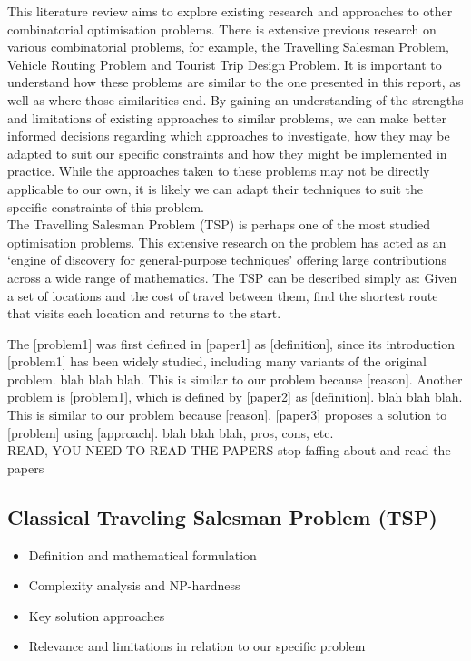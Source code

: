 This literature review aims to explore existing research and approaches to other combinatorial optimisation problems.
There is extensive previous research on various combinatorial problems, for example, the Travelling Salesman
Problem, Vehicle Routing Problem and Tourist Trip Design Problem.
It is important to understand how these problems are similar to the one presented in this report, as well as where
those similarities end.
By gaining an understanding of the strengths and limitations of existing approaches to similar problems, we can make
better informed decisions regarding which approaches to investigate, how they may be adapted to suit our specific
constraints and how they might be implemented in practice.
While the approaches taken to these problems may not be directly applicable to our own, it is likely we can adapt their
techniques to suit the specific constraints of this problem.\\

The Travelling Salesman Problem (TSP) is perhaps one of the most studied optimisation problems.
This extensive research on the problem has acted as an `engine of discovery for general-purpose techniques' offering
large contributions across a wide range of mathematics. 
The TSP can be described simply as: Given a set of locations and the cost of travel between them, find the shortest
route that visits each location and returns to the start.


The [problem1] was first defined in [paper1] as [definition], since its introduction [problem1] has been widely
studied, including many variants of the original problem.
blah blah blah.
This is similar to our problem because [reason].
Another problem is [problem1], which is defined by [paper2] as [definition].
blah blah blah.
This is similar to our problem because [reason].
[paper3] proposes a solution to [problem] using [approach].
blah blah blah, pros, cons, etc.\\

READ, YOU NEED TO READ THE PAPERS stop faffing about and read the papers


\subsection{Classical Traveling Salesman Problem (TSP)}
\begin{itemize}
    \item Definition and mathematical formulation
    \item Complexity analysis and NP-hardness
    \item Key solution approaches
    \item Relevance and limitations in relation to our specific problem
\end{itemize}

